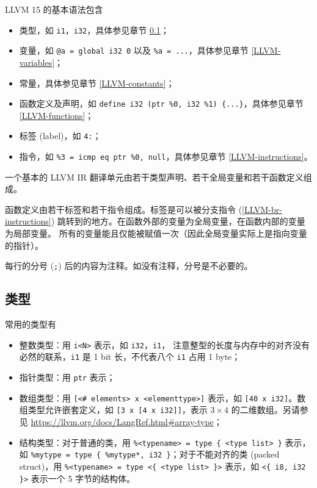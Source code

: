 LLVM 15 的基本语法包含
\begin{itemize}
  \item 类型，如 \texttt{i1}，\texttt{i32}，具体参见章节 \ref{LLVM-types}；
  \item 变量，如 \texttt{@a = global i32 0} 以及
    \texttt{\%a = ...}，具体参见章节 \ref{LLVM-variables}；
  \item 常量，具体参见章节 \ref{LLVM-constants}；
  \item 函数定义及声明，如 \texttt{define i32 \@foo(ptr \%0, i32 \%1) \{...\}}，具体参见章节
    \ref{LLVM-functions}；
  \item 标签 (label)，如 \texttt{4:}；
  \item 指令，如 \texttt{\%3 = icmp eq ptr \%0, null}，具体参见章节
    \ref{LLVM-instructions}。
\end{itemize}

一个基本的 LLVM IR 翻译单元由若干类型声明、若干全局变量和若干函数定义组成。

函数定义由若干标签和若干指令组成。标签是可以被分支指令 (\ref{LLVM-br-instructions})
跳转到的地方。在函数外部的变量为全局变量，在函数内部的变量为局部变量。
所有的变量能且仅能被赋值一次（因此全局变量实际上是指向变量的指针）。

每行的分号 (\texttt{;}) 后的内容为注释。如没有注释，分号是不必要的。

\subsection{类型}\label{LLVM-types}

常用的类型有
\begin{itemize}
  \item 整数类型：用 \texttt{i<N>} 表示，如 \texttt{i32}，\texttt{i1}，
    注意整型的长度与内存中的对齐没有必然的联系，\texttt{i1} 是 1 bit 长，不代表八个 \texttt{i1}
    占用 1 byte；
  \item 指针类型：用 \texttt{ptr} 表示；
  \item 数组类型：用 \texttt{[<\# elements> x <elementtype>]} 表示，如
    \texttt{[40 x i32]}。数组类型允许嵌套定义，如
    \texttt{[3 x [4 x i32]]}，表示 $3\times 4$ 的二维数组。另请参见
    \url{https://llvm.org/docs/LangRef.html#array-type}；
  \item 结构类型：对于普通的类，用 \texttt{\%<typename> = type \{ <type list> \}} 表示，如
    \texttt{\%mytype = type \{ \%mytype*, i32 \}}；对于不能对齐的类
    (packed struct)，用 \texttt{\%<typename> = type <\{ <type list> \}>}
    表示，如 \texttt{<\{ i8, i32 \}>} 表示一个 5 字节的结构体。
\end{itemize}

